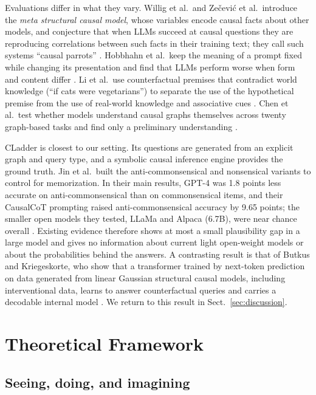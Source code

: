 \documentclass{llncs}
\begin{document}
Evaluations differ in what they vary. Willig et al.\ and Zečević et al.\ introduce the \emph{meta structural causal model}, whose variables encode causal facts about other models, and conjecture that when LLMs succeed at causal questions they are reproducing correlations between such facts in their training text; they call such systems ``causal parrots'' \cite{willig2022can,Zecevic2023CausalPL}. Hobbhahn et al.\ keep the meaning of a prompt fixed while changing its presentation and find that LLMs perform worse when form and content differ \cite{hobbhahn2022investigating}. Li et al.\ use counterfactual premises that contradict world knowledge (``if cats were vegetarians'') to separate the use of the hypothetical premise from the use of real-world knowledge and associative cues \cite{li2023counterfactual}. Chen et al.\ test whether models understand causal graphs themselves across twenty graph-based tasks and find only a preliminary understanding \cite{chen2024clear}.

CLadder \cite{jin2023cladder} is closest to our setting. Its questions are generated from an explicit graph and query type, and a symbolic causal inference engine provides the ground truth. Jin et al.\ built the anti-commonsensical and nonsensical variants to control for memorization. In their main results, GPT-4 was 1.8 points less accurate on anti-commonsensical than on commonsensical items, and their CausalCoT prompting raised anti-commonsensical accuracy by 9.65 points; the smaller open models they tested, LLaMa and Alpaca (6.7B), were near chance overall \cite{jin2023cladder}. Existing evidence therefore shows at most a small plausibility gap in a large model and gives no information about current light open-weight models or about the probabilities behind the answers. A contrasting result is that of Butkus and Kriegeskorte, who show that a transformer trained by next-token prediction on data generated from linear Gaussian structural causal models, including interventional data, learns to answer counterfactual queries and carries a decodable internal model \cite{butkus2025causal}. We return to this result in Sect.~\ref{sec:discussion}.

\section{Theoretical Framework}
\label{sec:theory}

\subsection{Seeing, doing, and imagining}
\label{sec:ladder}
\end{document}
